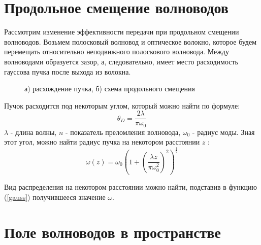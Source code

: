 \section{Продольное смещение волноводов}
Рассмотрим изменение эффективности передачи при продольном смещении волноводов. Возьмем полосковый волновод и оптическое волокно, которое будем перемещать относительно неподвижного полоскового волновода. Между волноводами образуется зазор, а, следовательно, имеет место расходимость гауссова пучка после выхода из волокна.
\begin{figure}[h!]
	\begin{minipage}[h]{0.49\linewidth}
	\end{minipage}
	\hfill
	\begin{minipage}[h]{0.49\linewidth}
	\end{minipage}
	\caption{а) расхождение пучка, б) схема продольного смещения}
\end{figure}

Пучок расходится под некоторым углом, который можно найти по формуле\cite{okamoto}:
\begin{equation}
	\theta_D = \frac{2\lambda}{\pi \omega_0}
	\label{divergence}
\end{equation}
$\lambda$ - длина волны, $n$ - показатель преломления волновода, $\omega_0$ - радиус моды.
Зная этот угол, можно найти радиус пучка на некотором расстоянии $z$ \cite{lefevre}:
\begin{equation}
	\omega(z) = \omega_0 \left( 1 + \left(\frac{\lambda z}{\pi \omega_0^2}\right)^2 \right)^\frac{1}{2}
\end{equation}

Вид распределения на некотором расстоянии можно найти, подставив в функцию (\ref{gauss}) получившееся значение $\omega$.

\section{Поле волноводов в пространстве}

